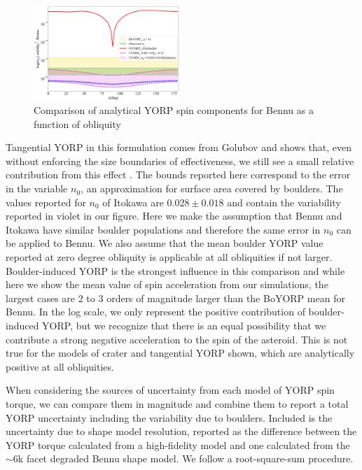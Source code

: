 \begin{figure}[H]
    \centering
    \includegraphics[width=0.49\textwidth]{fig/all_yorps.png}
    \caption{Comparison of analytical YORP spin components for Bennu as a function of obliquity}
    \label{fig:all_yorps}
\end{figure}
Tangential YORP in this formulation comes from Golubov and shows that, even without enforcing the size boundaries of effectiveness, we still see a small relative contribution from this effect \citep{Golubov2017}. The bounds reported here correspond to the error in the variable $n_0$, an approximation for surface area covered by boulders. The values reported for $n_0$ of Itokawa are $0.028\pm0.018$ and contain the variability reported in violet in our figure. Here we make the assumption that Bennu and Itokawa have similar boulder populations and therefore the same error in $n_0$ can be applied to Bennu. We also assume that the mean boulder YORP value reported at zero degree obliquity is applicable at all obliquities if not larger. Boulder-induced YORP is the strongest influence in this comparison and while here we show the mean value of spin acceleration from our simulations, the largest cases are 2 to 3 orders of magnitude larger than the BoYORP mean for Bennu. In the log scale, we only represent the positive contribution of boulder-induced YORP, but we recognize that there is an equal possibility that we contribute a strong negative acceleration to the spin of the asteroid. This is not true for the models of crater and tangential YORP shown, which are analytically positive at all obliquities. 


When considering the sources of uncertainty from each model of YORP spin torque, we can compare them in magnitude and combine them to report a total YORP uncertainty including the variability due to boulders. Included is the uncertainty due to shape model resolution, reported as the difference between the YORP torque calculated from a high-fidelity model and one calculated from the $\sim$6k facet degraded Bennu shape model. We follow a root-square-sum procedure. 

